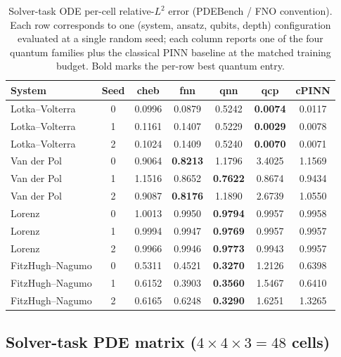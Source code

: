\documentclass[%
  prx,
  amsmath,
  amssymb,
  aps,
  reprint,
  superscriptaddress,
  floatfix,
]{revtex4-2}
\newcommand{\fhn}{FitzHugh--Nagumo}
\newcommand{\lv}{Lotka--Volterra}
\newcommand{\vdp}{Van der Pol}
\begin{document}
\begin{table}[t]
\centering
\caption{Solver-task ODE per-cell relative-$L^2$ error
(PDEBench / FNO convention). Each row corresponds to one
(system, ansatz, qubits, depth) configuration evaluated at a
single random seed; each column reports one of the four
quantum families plus the classical PINN baseline at the
matched training budget. Bold marks the per-row best quantum
entry.}
\label{sup:tab:solver-ode}
\footnotesize
\setlength{\tabcolsep}{4pt}
\begin{tabular}{lc|cccc|c}
\toprule
System & Seed & cheb & fnn & qnn & qcp & cPINN \\
\midrule
\lv{} & 0 & 0.0996 & 0.0879 & 0.5242 & \textbf{0.0074} & 0.0117 \\
\lv{} & 1 & 0.1161 & 0.1407 & 0.5229 & \textbf{0.0029} & 0.0078 \\
\lv{} & 2 & 0.1024 & 0.1409 & 0.5240 & \textbf{0.0070} & 0.0071 \\
\vdp{} & 0 & 0.9064 & \textbf{0.8213} & 1.1796 & 3.4025 & 1.1569 \\
\vdp{} & 1 & 1.1516 & 0.8652 & \textbf{0.7622} & 0.8674 & 0.9434 \\
\vdp{} & 2 & 0.9087 & \textbf{0.8176} & 1.1890 & 2.6739 & 1.0550 \\
Lorenz & 0 & 1.0013 & 0.9950 & \textbf{0.9794} & 0.9957 & 0.9958 \\
Lorenz & 1 & 0.9994 & 0.9947 & \textbf{0.9769} & 0.9957 & 0.9957 \\
Lorenz & 2 & 0.9966 & 0.9946 & \textbf{0.9773} & 0.9943 & 0.9957 \\
\fhn{} & 0 & 0.5311 & 0.4521 & \textbf{0.3270} & 1.2126 & 0.6398 \\
\fhn{} & 1 & 0.6152 & 0.3903 & \textbf{0.3560} & 1.5467 & 0.6410 \\
\fhn{} & 2 & 0.6165 & 0.6248 & \textbf{0.3290} & 1.6251 & 1.3265 \\
\bottomrule
\end{tabular}
\end{table}

\subsection{Solver-task PDE matrix ($4 \times 4 \times 3 = 48$ cells)}
\label{sup:solver-pde}
\end{document}

